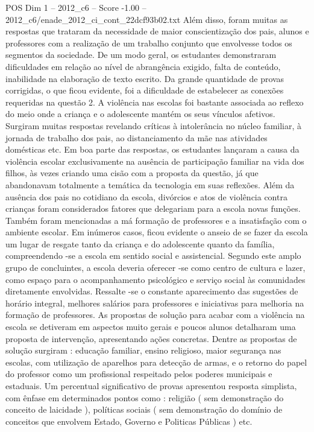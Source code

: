 \begin{textsample}{POS Dim 1 – 2012\_c6 – Score -1.00 – 2012\_c6/enade\_2012\_ci\_cont\_22dcf93b02.txt}
Além disso, foram muitas as respostas que trataram da necessidade de maior conscientização dos pais, alunos e professores com a realização de um trabalho conjunto que envolvesse todos os segmentos da sociedade.
De um modo geral, os estudantes demonstraram dificuldades em relação ao nível de abrangência exigido, falta de conteúdo, inabilidade na elaboração de texto escrito.
Da grande quantidade de provas corrigidas, o que ficou evidente, foi a dificuldade de estabelecer as conexões requeridas na questão 2.
A violência nas escolas foi bastante associada ao reflexo do meio onde a criança e o adolescente mantém os seus vínculos afetivos.
Surgiram muitas respostas revelando críticas à intolerância no núcleo familiar, à jornada de trabalho dos pais, ao distanciamento da mãe nas atividades domésticas etc.
Em boa parte das respostas, os estudantes lançaram a causa da violência escolar exclusivamente na ausência de participação familiar na vida dos filhos, às vezes criando uma cisão com a proposta da questão, já que abandonavam totalmente a temática da tecnologia em suas reflexões.
Além da ausência dos pais no cotidiano da escola, divórcios e atos de violência contra crianças foram considerados fatores que delegariam para a escola novas funções.
Também foram mencionadas a má formação de professores e a insatisfação com o ambiente escolar.
Em inúmeros casos, ficou evidente o anseio de se fazer da escola um lugar de resgate tanto da criança e do adolescente quanto da família, compreendendo -se a escola em sentido social e assistencial.
Segundo este amplo grupo de concluintes, a escola deveria oferecer -se como centro de cultura e lazer, como espaço para o acompanhamento psicológico e serviço social às comunidades diretamente envolvidas.
Ressalte -se o constante aparecimento das sugestões de horário integral, melhores salários para professores e iniciativas para melhoria na formação de professores.
As propostas de solução para acabar com a violência na escola se detiveram em aspectos muito gerais e poucos alunos detalharam uma proposta de intervenção, apresentando ações concretas.
Dentre as propostas de solução surgiram : educação familiar, ensino religioso, maior segurança nas escolas, com utilização de aparelhos para detecção de armas, e o retorno do papel do professor como um profissional respeitado pelos poderes municipais e estaduais.
Um percentual significativo de provas apresentou resposta simplista, com ênfase em determinados pontos como : religião ( sem demonstração do conceito de laicidade ), políticas sociais ( sem demonstração do domínio de conceitos que envolvem Estado, Governo e Politicas Públicas ) etc.

\end{textsample}
